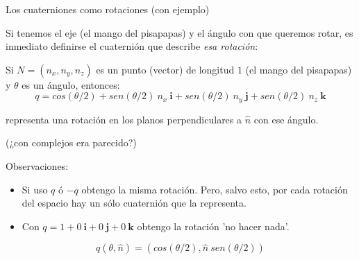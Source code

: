 \documentclass[10pt]{beamer}
\def\R{\mathbb{R}}
\begin{document}
\begin{frame}{Los cuaterniones como rotaciones (con ejemplo)}


Si tenemos el eje (el mango del pisapapas) y el ángulo con que queremos rotar, es inmediato definirse el cuaternión que describe \textit{esa rotación}: 

Si $N= (n_x,n_y,n_z)$ es un punto (vector) de longitud $1$ (el mango del pisapapas) y $\theta$ es un ángulo, entonces: 
$$q = cos(\theta/2) + sen(\theta/2)\ n_x\ \textbf{i} + sen(\theta/2)\ n_y\ \textbf{j} + sen(\theta/2)\ n_z\ \textbf{k}$$

representa una rotación en los planos perpendiculares a $\hat{n}$ con ese ángulo. 

(¿con complejos era parecido?)



 Observaciones: 

\begin{itemize}
	\item Si uso $q$ ó $-q$ obtengo la misma rotación. Pero, salvo esto, por cada rotación del espacio hay un sólo cuaternión que la representa.
	\item Con $q=1 + 0\ \textbf{i} + 0\ \textbf{j} + 0\ \textbf{k}$ obtengo la rotación 'no hacer nada'. %
\end{itemize}


$$q(\theta, \hat{n}) = (cos(\theta/2), \hat{n}\ sen(\theta/2))$$




\end{frame}
\end{document}
